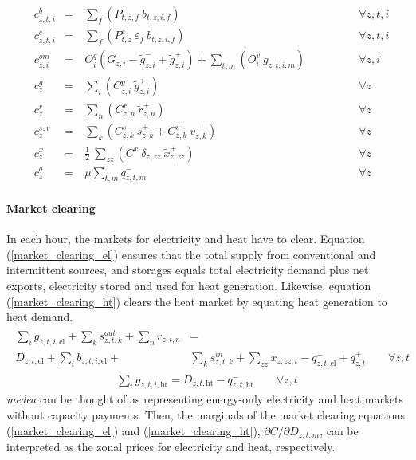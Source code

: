 \documentclass[11pt,a4paper]{article}
\begin{document}
\begin{align}
&c^{b}_{z,t,i}& =&\ \sum_{f} \left( P_{t,z,f} \: b_{t,z,i,f} \right) \qquad \qquad &\forall z,t,i \label{fuel_cost} \\
&c^{e}_{z,t,i}& =&\ \sum_{f} \left( P^{e}_{t,z} \: \varepsilon_{f} \: b_{t,z,i,f} \right) \qquad \qquad &\forall z,t,i\\
&c^{om}_{z,i}& =&\ O^{q}_{i} \left(\widetilde{G}_{z,i} - \widetilde{g}^{-}_{z,i} + \widetilde{g}^{+}_{z,i}\right) + \sum_{t,m} \left(O^{v}_{i} \: g_{z,t,i,m}\right) \qquad \qquad &\forall z,i \\
&c^{g}_{z}& =&\ \sum_{i} \left( C^{g}_{z,i} \: \widetilde{g}^{+}_{z,i} \right) \qquad \qquad &\forall z\\
&c^{r}_{z}& =&\ \sum_{n} \left( C^{r}_{z,n} \: \widetilde{r}^{+}_{z,n} \right) \qquad \qquad &\forall z\\
&c^{s,v}_{z}& =&\ \sum_{k} \left( C^{s}_{z,k} \: \widetilde{s}^{+}_{z,k} + C^{v}_{z,k} \: v^{+}_{z,k} \right) \qquad \qquad &\forall z\\
&c^{x}_{z}& =&\ \frac{1}{2} \: \sum_{zz} (C^{x} \: \delta_{z,zz} \: \widetilde{x}^{+}_{z,zz}) \qquad \qquad &\forall z \label{transmission_expansion_cost}\\
&c^{q}_{z}& =&\ \mu \sum_{t,m} q^{-}_{z,t,m} \qquad \qquad &\forall z \label{lost_load_cost}
\end{align}

\paragraph{Market clearing}
In each hour, the markets for electricity and heat have to clear.
Equation (\ref{market_clearing_el}) ensures that the total supply from conventional and intermittent sources, and storages equals total electricity demand plus net exports, electricity stored and used for heat generation. 
Likewise, equation (\ref{market_clearing_ht}) clears the heat market by equating heat generation to heat demand.
\begin{align}
\begin{split}
\sum_{i} g_{z,t,i,\text{el}} + \sum_{k} s^{out}_{z,t,k} + \sum_{n} r_{z,t,n} &=  \\ D_{z,t,\text{el}} + \sum_{i} b_{z,t,i,\text{el}} + & \sum_{k} s^{in}_{z,t,k} + \sum_{zz} x_{z,zz,t} - q^{-}_{z,t,\text{el}} + q^{+}_{z,t} \qquad \forall z,t 
\end{split}
\label{market_clearing_el}
\end{align} 
\begin{align}
\sum_{i} g_{z,t,i,\text{ht}} = D_{z,t,\text{ht}} - q^{-}_{z,t,\text{ht}} \qquad \forall z,t \label{market_clearing_ht}
\end{align}
\emph{medea} can be thought of as representing energy-only electricity and heat markets without capacity payments. Then, the marginals of the market clearing equations (\ref{market_clearing_el}) and (\ref{market_clearing_ht}), $\partial C / \partial D_{z,t,m}$, can be interpreted as the zonal prices for electricity and heat, respectively.
\end{document}
